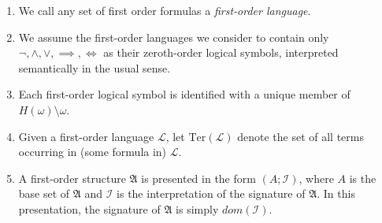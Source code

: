 \documentclass[12pt]{article}
\numberwithin{equation}{section}
\begin{document}
\begin{con}\label{firstconv}
\leavevmode
\begin{enumerate}[label=(\arabic*)]
    \item We call any set of first order formulas a \emph{first-order language}.
    \item We assume the first-order languages we consider to contain only $\neg, \wedge, \vee, \implies, \iff$ as their zeroth-order logical symbols, interpreted semantically in the usual sense. 
    \item Each first-order logical symbol is identified with a unique member of $H(\omega) \setminus \omega$.
    \item Given a first-order language $\mathcal{L}$, let $\mathrm{Ter}(\mathcal{L})$ denote the set of all terms occurring in (some formula in) $\mathcal{L}$.
    \item A first-order structure $\mathfrak{A}$ is presented in the form $(A; \mathcal{I})$, where $A$ is the base set of $\mathfrak{A}$ and $\mathcal{I}$ is the interpretation of the signature of $\mathfrak{A}$. In this presentation, the signature of $\mathfrak{A}$ is simply $dom(\mathcal{I})$. 
    

\end{enumerate}
\end{con}
\end{document}
